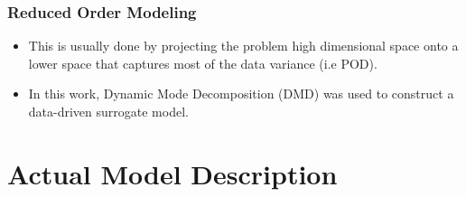 \documentclass[fleqn]{beamer}
\renewcommand{\vec}[1]{\bm{#1}} %
\begin{document}
    \begin{frame}
    \frametitle{Reduced Order Modeling}

    \begin{itemize}
   \begin{block}{ROM}
\centering
$\vec{f}(\vec{x})\approx \vec{g}(\mathcal{M}(\vec{x})); \ \ \vec{x} \subseteq \mathbb{R}^n, \mathcal{M}(\vec{x}) \in \mathbb{R}^{r_x}; r_x << n$
\end{block}

    \item This is usually done by projecting the problem high dimensional space onto a lower space that captures most of the data variance (i.e POD).
    
    \item In this work, Dynamic Mode Decomposition (DMD) was used to construct a data-driven surrogate model. 
    \end{itemize}
    \end{frame}
    \section{Actual Model Description}
\end{document}
